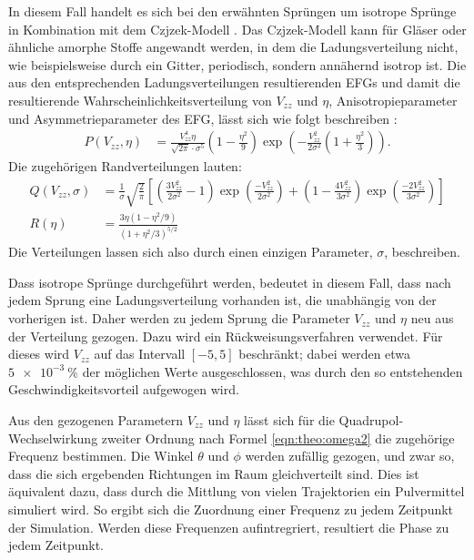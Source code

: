 In diesem Fall handelt es sich bei den erwähnten Sprüngen um isotrope Sprünge in Kombination mit dem Czjzek-Modell \cite{czjzek_atomic_1981}. Das Czjzek-Modell kann für Gläser oder ähnliche amorphe Stoffe angewandt werden, in dem die Ladungsverteilung nicht, wie beispielsweise durch ein Gitter, periodisch, sondern annähernd isotrop ist. Die aus den entsprechenden Ladungsverteilungen resultierenden EFGs und damit die resultierende Wahrscheinlichkeitsverteilung von $V_{zz}$ und $\eta$, Anisotropieparameter und Asymmetrieparameter des EFG, lässt sich wie folgt beschreiben \cite[S. 10722 - 10723]{caer}:
\begin{align}
	P \left( V_{zz}, \eta \right) & = \frac{V_{zz}^4 \eta}{\sqrt{2 \pi} \cdot \sigma^5} \left( 1 - \frac{\eta^2}{9} \right)\exp \left( - \frac{V_{zz}^2}{2 \sigma^2} \left( 1 + \frac{\eta^2}{3} \right) \right). \label{eqn:sim:czjzek}
\end{align}
Die zugehörigen Randverteilungen lauten:
\begin{align}
    Q (V_{zz}, \sigma) &= \frac{1}{\sigma} \sqrt{\frac{2}{\pi}} \left[ \left( \frac{3 V_{zz}^2}{2 \sigma^2} - 1 \right) \exp{ \left( \frac{- V_{zz}^2}{2 \sigma^2} \right) } + \left( 1 - \frac{4 V_{zz}^2}{3 \sigma^2} \right) \exp{ \left( \frac{-2 V_{zz}^2}{3 \sigma^2} \right) } \right] \label{eqn:sim:czjzek_Q} \\
    R(\eta) &= \frac{3\eta (1 - \eta^2 / 9)}{(1 + \eta^2 / 3)^{5/2}} \label{eqn:sim:czjzek_R}
\end{align}
Die Verteilungen lassen sich also durch einen einzigen Parameter, $\sigma$, beschreiben.

Dass isotrope Sprünge durchgeführt werden, bedeutet in diesem Fall, dass nach jedem Sprung eine Ladungsverteilung vorhanden ist, die unabhängig von der vorherigen ist. Daher werden zu jedem Sprung die Parameter $V_{zz}$ und $\eta$ neu aus der Verteilung gezogen. Dazu wird ein Rückweisungsverfahren verwendet. Für dieses wird $V_{zz}$ auf das Intervall $\left[-5, 5 \right]$ beschränkt; dabei werden etwa $\SI{5e-3}{\percent}$ der möglichen Werte ausgeschlossen, was durch den so entstehenden Geschwindigkeitsvorteil aufgewogen wird.

Aus den gezogenen Parametern $V_{zz}$ und $\eta$ lässt sich für die Quadrupol-Wechselwirkung zweiter Ordnung nach Formel \ref{eqn:theo:omega2} die zugehörige Frequenz bestimmen. Die Winkel $\theta$ und $\phi$ werden zufällig gezogen, und zwar so, dass die sich ergebenden Richtungen im Raum gleichverteilt sind. Dies ist äquivalent dazu, dass durch die Mittlung von vielen Trajektorien ein Pulvermittel simuliert wird. So ergibt sich die Zuordnung einer Frequenz zu jedem Zeitpunkt der Simulation. Werden diese Frequenzen aufintregriert, resultiert die Phase zu jedem Zeitpunkt.

